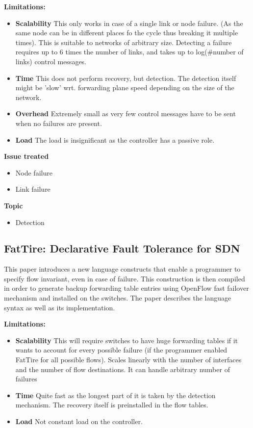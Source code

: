 \documentclass[compsoc]{IEEEtran}
\begin{document}
\textbf{Limitations:}
\begin{itemize}
	\item \textbf{Scalability} This only works in case of a single link or node failure. (As the same node can be in different places fo the cycle thus breaking it multiple times). This is suitable to networks of arbitrary size. Detecting a failure requires up to 6 times the number of links, and takes up to log(\#number of links) control messages.
	\item \textbf{Time} This does not perform recovery, but detection. The detection itself might be 'slow' wrt. forwarding plane speed depending on the size of the network.
	\item \textbf{Overhead} Extremely small as very few control messages have to be sent when no failures are present.
	\item \textbf{Load} The load is insignificant as the controller has a passive role.
\end{itemize}

\textbf{Issue treated}
\begin{itemize}
	\item Node failure
	\item Link failure
\end{itemize}

\textbf{Topic}
\begin{itemize}
	\item Detection
\end{itemize}

\subsection{FatTire: Declarative Fault Tolerance for SDN \cite{Reitblatt:2013:FDF:2491185.2491187}}
This paper introduces a new language constructs that enable a programmer to specify flow invariant, even in case of failure. This construction is then compiled in order to generate backup forwarding table entries using OpenFlow fast failover mechanism and installed on the switches.
The paper describes the language syntax as well as its implementation.

\textbf{Limitations:}
\begin{itemize}
	\item \textbf{Scalability} This will require switches to have huge forwarding tables if it wants to account for every possible failure (if the programmer enabled FatTire for all possible flows). Scales linearly with the number of interfaces and the number of flow destinations. It can handle arbitrary number of failures
	\item \textbf{Time} Quite fast as the longest part of it is taken by the detection mechanism. The recovery itself is preinstalled in the flow tables.
	\item \textbf{Load} Not constant load on the controller.
\end{itemize}
\end{document}
